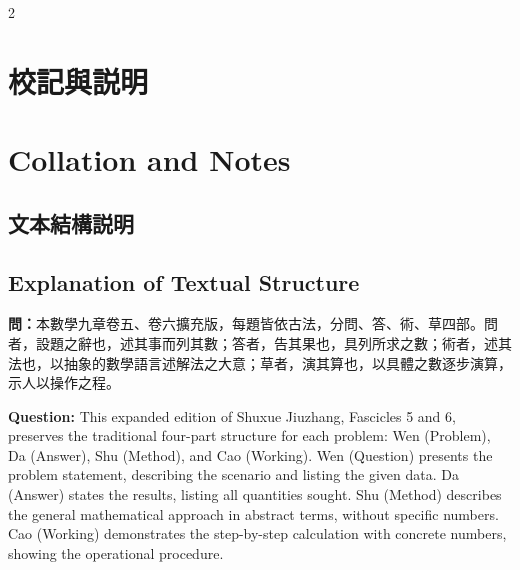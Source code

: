\documentclass[11pt,a4paper]{article}
\newcommand{\QuestionText}[1]{\par\noindent\textbf{\color{problemcolor}問：}#1\par}
\newcommand{\QuestionEn}[1]{\par\noindent\textbf{\color{problemcolor}Question:} #1\par}
\begin{document}
\newpage
\begin{paracol}{2}

\section*{\color{titlecolor}校記與説明}
\switchcolumn
\section*{\color{titlecolor}Collation and Notes}
\switchcolumn*

\subsection*{文本結構説明}
\switchcolumn
\subsection*{Explanation of Textual Structure}
\switchcolumn*

\QuestionText{本數學九章卷五、卷六擴充版，每題皆依古法，分問、答、術、草四部。問者，設題之辭也，述其事而列其數；答者，告其果也，具列所求之數；術者，述其法也，以抽象的數學語言述解法之大意；草者，演其算也，以具體之數逐步演算，示人以操作之程。}
\switchcolumn
\QuestionEn{This expanded edition of Shuxue Jiuzhang, Fascicles 5 and 6, preserves the traditional four-part structure for each problem: Wen (Problem), Da (Answer), Shu (Method), and Cao (Working). Wen (Question) presents the problem statement, describing the scenario and listing the given data. Da (Answer) states the results, listing all quantities sought. Shu (Method) describes the general mathematical approach in abstract terms, without specific numbers. Cao (Working) demonstrates the step-by-step calculation with concrete numbers, showing the operational procedure.}
\switchcolumn*


\end{paracol}
\end{document}
